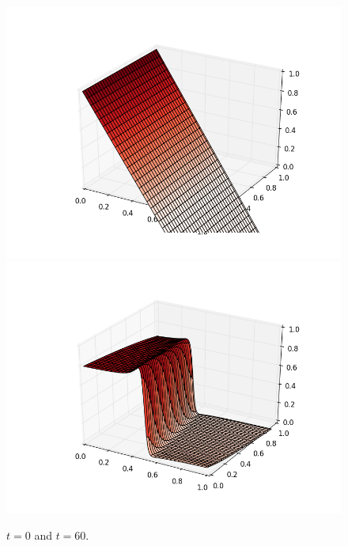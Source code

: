 \documentclass[12pt]{article}
\begin{document}
\begin{figure}[H]
\includegraphics[scale=0.4]{partc_fig_frames/partc_fig01.png}%
\includegraphics[scale=0.4]{partc_fig_frames/partc_fig03.png}
\caption{$t=0$ and $t=60$.}
\end{figure}
\end{document}
